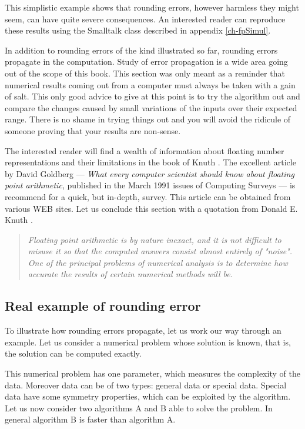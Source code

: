 \documentclass[twoside]{book}
\begin{document}
This simplistic example shows that rounding errors, however
harmless they might seem, can have quite severe consequences. An
interested reader can reproduce these results using the Smalltalk
class described in appendix \ref{ch-fpSimul}.

In addition to rounding errors of the kind illustrated so far,
rounding errors propagate in the computation. Study of error
propagation is a wide area going out of the scope of this book.
This section was only meant as a reminder that numerical results
coming out from a computer must always be taken with a gain of
salt. This only good advice to give at this point is to try the
algorithm out and compare the changes caused by small variations
of the inputs over their expected range. There is no shame in
trying things out and you will avoid the ridicule of someone
proving that your results are non-sense.

The interested reader will find a wealth of information about
floating number representations and their limitations in the book
of Knuth \cite{Knuth2}. The excellent article by David Goldberg
--- {\it What every computer scientist should know about floating
point arithmetic}, published in the March 1991 issues of Computing
Surveys --- is recommend for a quick, but in-depth, survey. This
article can be obtained from various WEB sites. Let us conclude
this section with a quotation from Donald E. Knuth \cite{Knuth2}.
\begin{quote}
{\sl Floating point arithmetic is by nature inexact, and it is not
difficult to misuse it so that the computed answers consist almost
entirely of "noise". One of the principal problems of numerical
analysis is to determine how accurate the results of certain
numerical methods will be.}
\end{quote}

\subsection{Real example of rounding error}
\label{sec:roundingintro} To illustrate how rounding errors
propagate, let us work our way through an example. Let us consider
a numerical problem whose solution is known, that is, the solution
can be computed exactly.

This numerical problem has one parameter, which measures the
complexity of the data. Moreover data can be of two types: general
data or special data. Special data have some symmetry properties,
which can be exploited by the algorithm. Let us now consider two
algorithms A and B able to solve the problem. In general algorithm
B is faster than algorithm A.
\end{document}
